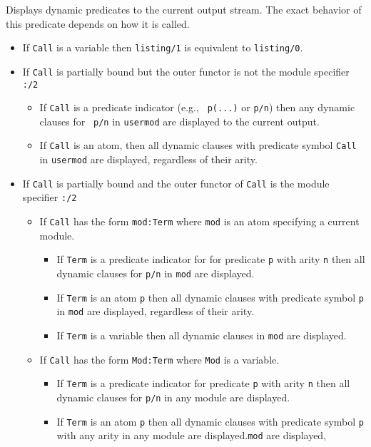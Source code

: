 \begin{description}

Displays dynamic predicates to the current output stream.  The
exact behavior of this predicate depends on how it is called.

  \begin{itemize}
    \item If {\tt Call} is a variable then {\tt listing/1} is
        equivalent to {\tt listing/0}.
      \item If {\tt Call} is partially bound but the outer functor is
        not the module specifier {\tt :/2}
        \begin{itemize}
          \item If {\tt Call} is a predicate indicator (e.g., {\tt
            p(...)} or {\tt p/n}) then any dynamic clauses for {\tt
            p/n} in {\tt usermod} are displayed to the current output.
          \item If {\tt Call} is an atom, then all dynamic clauses
            with predicate symbol {\tt Call} in {\tt usermod} are
            displayed, regardless of their arity.
        \end{itemize}
      \item If {\tt Call} is partially bound and the outer functor of
        {\tt Call} is the module specifier {\tt :/2}
        \begin{itemize}
        \item If {\tt Call} has the form {\tt mod:Term} where {\tt mod}
          is an atom specifying a current module.
          \begin{itemize}
            \item If {\tt Term} is a predicate indicator for for
              predicate {\tt p} with arity {\tt n} then all dynamic
              clauses for {\tt p/n} in {\tt mod} are displayed.
            \item If {\tt Term} is an atom {\tt p} then all dynamic
              clauses with predicate symbol {\tt p} in {\tt mod} are
              displayed, regardless of their arity.
            \item If {\tt Term} is a variable then all dynamic
              clauses  in {\tt mod} are
              displayed.
          \end{itemize}
        \item If {\tt Call} has the form {\tt Mod:Term} where {\tt Mod}
          is a variable.
          \begin{itemize}
            \item If {\tt Term} is a predicate indicator for predicate
              {\tt p} with arity {\tt n} then all dynamic clauses for
              {\tt p/n} in any module are displayed.
            \item If {\tt Term} is an atom {\tt p} then all dynamic
              clauses with predicate symbol {\tt p} with any arity in
              any module are displayed.{\tt mod} are displayed,
          \end{itemize}
        \end{itemize}
  \end{itemize}
    

\end{description}
